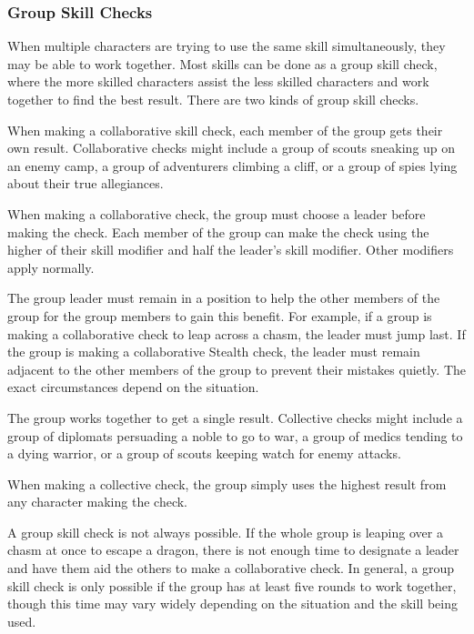         \subsubsection{Group Skill Checks}
            When multiple characters are trying to use the same skill simultaneously, they may be able to work together. Most skills can be done as a group skill check, where the more skilled characters assist the less skilled characters and work together to find the best result. There are two kinds of group skill checks.

             When making a collaborative skill check, each member of the group gets their own result. Collaborative checks might include a group of scouts sneaking up on an enemy camp, a group of adventurers climbing a cliff, or a group of spies lying about their true allegiances.

            When making a collaborative check, the group must choose a leader before making the check.
            Each member of the group can make the check using the higher of their skill modifier and half the leader's skill modifier. Other modifiers apply normally.

            The group leader must remain in a position to help the other members of the group for the group members to gain this benefit. For example, if a group is making a collaborative check to leap across a chasm, the leader must jump last. If the group is making a collaborative Stealth check, the leader must remain adjacent to the other members of the group to prevent their mistakes quietly. The exact circumstances depend on the situation.

             The group works together to get a single result. Collective checks might include a group of diplomats persuading a noble to go to war, a group of medics tending to a dying warrior, or a group of scouts keeping watch for enemy attacks.

            When making a collective check, the group simply uses the highest result from any character making the check.

             A group skill check is not always possible. If the whole group is leaping over a chasm at once to escape a dragon, there is not enough time to designate a leader and have them aid the others to make a collaborative check. In general, a group skill check is only possible if the group has at least five rounds to work together, though this time may vary widely depending on the situation and the skill being used.

